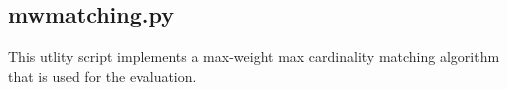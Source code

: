 \documentclass[12pt,letterpaper,onecolumn,oneside]{article}
\begin{document}
\begin{appendices}
\subsection{mwmatching.py}

This utlity script implements a max-weight max cardinality matching
algorithm that is used for the evaluation.

\end{appendices}



\end{document}
